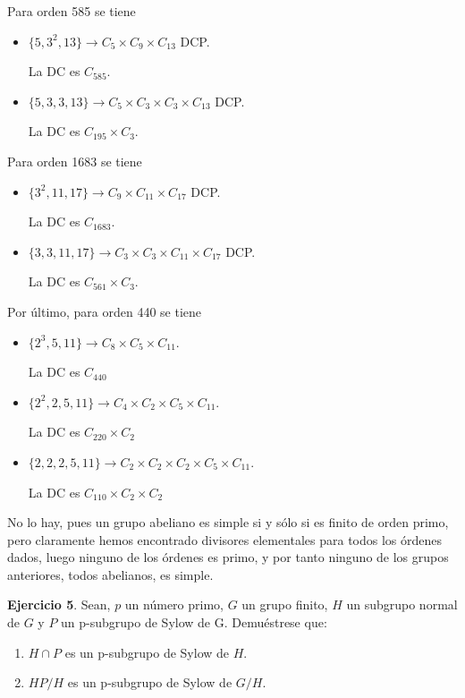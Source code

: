 \documentclass{article}
\begin{document}
\begin{enumerate}
Para orden 585 se tiene
\begin{itemize}
\item $\{5,3^2,13\}\longrightarrow C_5\times C_9\times C_{13}$ DCP.

La DC es $C_{585}$.

\item $\{5,3,3,13\}\longrightarrow C_5\times C_3\times C_3\times C_{13}$ DCP.

La DC es $C_{195}\times C_3$.
\end{itemize}

Para orden 1683 se tiene
\begin{itemize}
\item $\{3^2,11,17\}\longrightarrow C_9\times C_{11}\times C_{17}$ DCP.

La DC es $C_{1683}$.

\item $\{3,3,11,17\}\longrightarrow C_3\times C_3\times C_{11}\times C_{17}$ DCP.

La DC es $C_{561}\times C_{3}$.
\end{itemize}

Por último, para orden 440 se tiene
\begin{itemize}
\item $\{2^3,5,11\}\longrightarrow C_8\times C_5\times C_{11}$.

La DC es $C_{440}$

\item $\{2^2,2,5,11\}\longrightarrow C_4\times C_2\times C_5\times C_{11}$.

La DC es $C_{220}\times C_2$

\item $\{2,2,2,5,11\}\longrightarrow C_2\times C_2\times C_2\times C_5\times C_{11}$.

La DC es $C_{110}\times C_2\times C_2$
\end{itemize}

No lo hay, pues un grupo abeliano es simple si y sólo si es finito de orden primo, pero claramente hemos encontrado divisores elementales para todos los órdenes dados, luego ninguno de los órdenes es primo, y por tanto ninguno de los grupos anteriores, todos abelianos, es simple.
\end{enumerate}

\textbf{Ejercicio 5}. Sean, $p$ un número primo, $G$ un grupo finito, $H$ un subgrupo normal de $G$ y $P$ un p-subgrupo de Sylow de G. Demuéstrese que:
\begin{enumerate}
\item $H\cap P$ es un p-subgrupo de Sylow de $H$.

\item $HP/H$ es un p-subgrupo de Sylow de $G/H$.
\end{enumerate}
\end{document}

